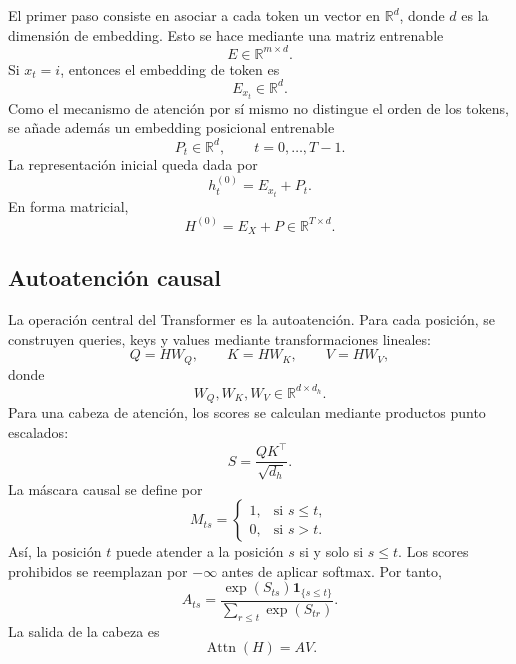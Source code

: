 \documentclass[11pt]{report}
\theoremstyle{definition}
\theoremstyle{plain}
\numberwithin{equation}{section}
\begin{document}
El primer paso consiste en asociar a cada token un vector en \(\mathbb{R}^d\), donde \(d\) es la dimensión de embedding. Esto se hace mediante una matriz entrenable
\begin{equation*}
    E\in\mathbb{R}^{m\times d}.
\end{equation*}
Si \(x_t=i\), entonces el embedding de token es
\begin{equation*}
    E_{x_t}\in\mathbb{R}^d.
\end{equation*}
Como el mecanismo de atención por sí mismo no distingue el orden de los tokens, se añade además un embedding posicional entrenable
\begin{equation*}
    P_t\in\mathbb{R}^d,
    \qquad
    t=0,\ldots,T-1.
\end{equation*}
La representación inicial queda dada por
\begin{equation*}
    h_t^{(0)}
    =
    E_{x_t}+P_t.
\end{equation*}
En forma matricial,
\begin{equation*}
    H^{(0)}
    =
    E_X+P
    \in\mathbb{R}^{T\times d}.
\end{equation*}

\subsection{Autoatención causal}

La operación central del Transformer es la autoatención. Para cada posición, se construyen queries, keys y values mediante transformaciones lineales:
\begin{equation*}
    Q=HW_Q,
    \qquad
    K=HW_K,
    \qquad
    V=HW_V,
\end{equation*}
donde
\begin{equation*}
    W_Q,W_K,W_V\in\mathbb{R}^{d\times d_h}.
\end{equation*}
Para una cabeza de atención, los scores se calculan mediante productos punto escalados:
\begin{equation*}
    S
    =
    \frac{QK^\top}{\sqrt{d_h}}.
\end{equation*}
La máscara causal se define por
\begin{equation*}
    M_{ts}
    =
    \begin{cases}
        1, & \text{si } s\leq t,\\
        0, & \text{si } s>t.
    \end{cases}
\end{equation*}
Así, la posición \(t\) puede atender a la posición \(s\) si y solo si \(s\leq t\). Los scores prohibidos se reemplazan por \(-\infty\) antes de aplicar softmax. Por tanto,
\begin{equation*}
    A_{ts}
    =
    \frac{\exp(S_{ts})\mathbf{1}_{\{s\leq t\}}}
    {\sum_{r\leq t}\exp(S_{tr})}.
\end{equation*}
La salida de la cabeza es
\begin{equation*}
    \operatorname{Attn}(H)
    =
    AV.
\end{equation*}
\end{document}
